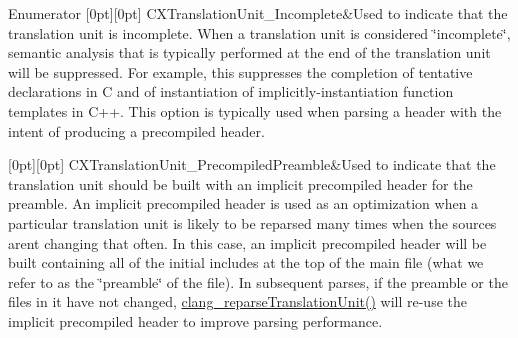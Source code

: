 \begin{DoxyEnumFields}{Enumerator}
[0pt][0pt]{}\mbox{\label{group__CINDEX__TRANSLATION__UNIT_ggab1e4965c1ebe8e41d71e90203a723fe9ad7cfbf9284a37c4324fc86fc7e4bcfc1}} 
C\+X\+Translation\+Unit\+\_\+\+Incomplete&Used to indicate that the translation unit is incomplete. When a translation unit is considered \char`\"{}incomplete\char`\"{}, semantic analysis that is typically performed at the end of the translation unit will be suppressed. For example, this suppresses the completion of tentative declarations in C and of instantiation of implicitly-\/instantiation function templates in C++. This option is typically used when parsing a header with the intent of producing a precompiled header. \\
\hline

[0pt][0pt]{}\mbox{\label{group__CINDEX__TRANSLATION__UNIT_ggab1e4965c1ebe8e41d71e90203a723fe9a790e560dd51389cb9dc370fe40ba60f8}} 
C\+X\+Translation\+Unit\+\_\+\+Precompiled\+Preamble&Used to indicate that the translation unit should be built with an implicit precompiled header for the preamble. An implicit precompiled header is used as an optimization when a particular translation unit is likely to be reparsed many times when the sources aren\textquotesingle{}t changing that often. In this case, an implicit precompiled header will be built containing all of the initial includes at the top of the main file (what we refer to as the \char`\"{}preamble\char`\"{} of the file). In subsequent parses, if the preamble or the files in it have not changed, {\ttfamily \mbox{\hyperlink{group__CINDEX__TRANSLATION__UNIT_ga524e76bf2a809d037934d4be51ea448a}{clang\+\_\+reparse\+Translation\+Unit()}}} will re-\/use the implicit precompiled header to improve parsing performance. \\
\hline


\end{DoxyEnumFields}
